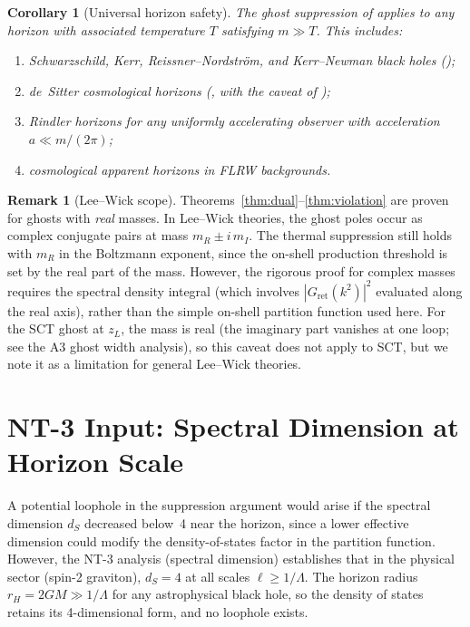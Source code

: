 \documentclass[11pt,a4paper]{article}
\theoremstyle{plain}
\newtheorem{corollary}[theorem]{Corollary}
\theoremstyle{definition}
\newtheorem{remark}[theorem]{Remark}
\begin{document}
\begin{corollary}[Universal horizon safety]\label{cor:universal}
  The ghost suppression of  applies to any horizon
  with associated temperature $T$ satisfying $m \gg T$.  This
  includes:
  \begin{enumerate}[label=\textup{(\alph*)}]
    \item Schwarzschild, Kerr, Reissner--Nordstr\"om, and
      Kerr--Newman black holes ();
    \item de~Sitter cosmological horizons (,
      with the caveat of );
    \item Rindler horizons for any uniformly accelerating observer
      with acceleration $a \ll m/(2\pi)$;
    \item cosmological apparent horizons in FLRW backgrounds.
  \end{enumerate}
\end{corollary}

\begin{remark}[Lee--Wick scope]\label{rem:lee_wick}
  Theorems~\ref{thm:dual}--\ref{thm:violation} are proven for ghosts
  with \emph{real} masses.  In Lee--Wick theories, the ghost poles
  occur as complex conjugate pairs at mass $m_R \pm i\,m_I$.  The
  thermal suppression still holds with $m_R$ in the Boltzmann
  exponent, since the on-shell production threshold is set by the
  real part of the mass.  However, the rigorous proof for complex
  masses requires the spectral density integral (which involves
  $|G_{\mathrm{ret}}(k^2)|^2$ evaluated along the real axis), rather
  than the simple on-shell partition function used here.  For the SCT
  ghost at $z_L$, the mass is real (the imaginary part vanishes at
  one loop; see the A3 ghost width analysis), so this caveat does not
  apply to SCT, but we note it as a limitation for general
  Lee--Wick theories.
\end{remark}


\section{NT-3 Input: Spectral Dimension at Horizon Scale}%
\label{sec:nt3}

A potential loophole in the suppression argument would arise if the
spectral dimension $d_S$ decreased below~4 near the horizon, since
a lower effective dimension could modify the density-of-states
factor in the partition function.  However, the NT-3 analysis
(spectral dimension) establishes that in the physical sector
(spin-2 graviton), $d_S = 4$ at all scales $\ell \geq 1/\Lambda$.
The horizon radius $r_H = 2GM \gg 1/\Lambda$ for any astrophysical
black hole, so the density of states retains its 4-dimensional form,
and no loophole exists.
\end{document}
